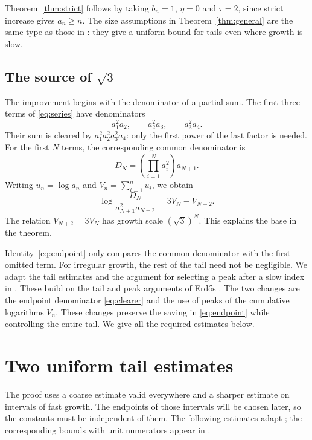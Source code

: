 \documentclass[11pt]{article}
\numberwithin{equation}{section}
\begin{document}
Theorem~\ref{thm:strict} follows by taking $b_n=1$, $\eta=0$ and
$\tau=2$, since strict increase gives $a_n\ge n$.
The size assumptions in Theorem~\ref{thm:general} are the same type
as those in \cite[Theorem~3]{BKKKZ}: they give a uniform bound for
tails even where growth is slow.

\subsection{The source of \texorpdfstring{$\sqrt3$}{sqrt(3)}} 

The improvement begins with the denominator of a partial sum.
The first three terms of \eqref{eq:series} have denominators
\[
  a_1^2a_2,\qquad a_2^2a_3,\qquad a_3^2a_4.
\]
Their sum is cleared by $a_1^2a_2^2a_3^2a_4$: only the first power
of the last factor is needed. For the first $N$ terms, the corresponding
common denominator is
\begin{equation}\label{eq:clearer}
  D_N=\left(\prod_{i=1}^N a_i^2\right)a_{N+1}.
\end{equation}
Writing $u_n=\log a_n$ and $V_n=\sum_{i=1}^n u_i$, we obtain
\begin{equation}\label{eq:endpoint}
  \log\frac{D_N}{a_{N+1}^2a_{N+2}}=3V_N-V_{N+2}.
\end{equation}
The relation $V_{N+2}=3V_N$ has growth scale $(\sqrt3)^N$.
This explains the base in the theorem.

Identity~\eqref{eq:endpoint} only compares the common denominator with
the first omitted term. For irregular growth, the rest of the tail
need not be negligible. We adapt the tail estimates and the argument
for selecting a peak after a slow index in
\cite[Lemmas~9--11 and Proposition~12]{BKKKZ}. These build on the
tail and peak arguments of Erd\H{o}s \cite[pp.~3--6]{Erdos1975}.
The two changes are the endpoint denominator \eqref{eq:clearer} and
the use of peaks of the cumulative logarithms $V_n$. These changes
preserve the saving in \eqref{eq:endpoint} while controlling the entire
tail. We give all the required estimates below.

\section{Two uniform tail estimates}\label{sec:tails}

The proof uses a coarse estimate valid everywhere and a sharper estimate
on intervals of fast growth. The endpoints of those intervals will be
chosen later, so the constants must be independent of them. The following
estimates adapt \cite[Lemma~10]{BKKKZ}; the corresponding bounds with
unit numerators appear in \cite[pp.~3--4]{Erdos1975}.
\end{document}
